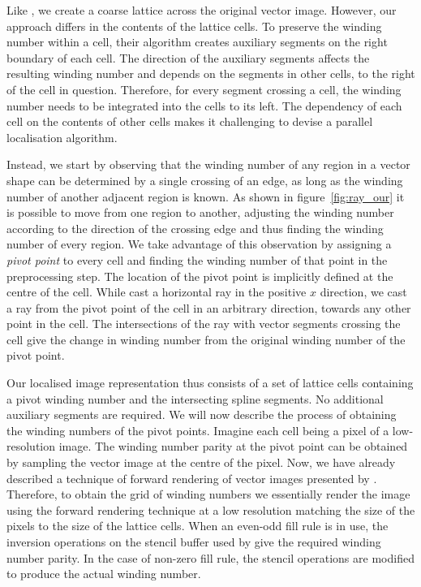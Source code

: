 \documentclass[11pt,a4paper,twoside]{article}
\begin{document}
Like \cite{NehabHoppe08}, we create a coarse lattice across the original vector image. However, our approach differs in the contents of the lattice cells. To preserve the winding number within a cell, their algorithm creates auxiliary segments on the right boundary of each cell. The direction of the auxiliary segments affects the resulting winding number and depends on the segments in other cells, to the right of the cell in question. Therefore, for every segment crossing a cell, the winding number needs to be integrated into the cells to its left. The dependency of each cell on the contents of other cells makes it challenging to devise a parallel localisation algorithm.

Instead, we start by observing that the winding number of any region in a vector shape can be determined by a single crossing of an edge, as long as the winding number of another adjacent region is known. As shown in figure~\ref{fig:ray_our} it is possible to move from one region to another, adjusting the winding number according to the direction of the crossing edge and thus finding the winding number of every region. We take advantage of this observation by assigning a \emph{pivot point} to every cell and finding the winding number of that point in the preprocessing step. The location of the pivot point is implicitly defined at the centre of the cell. While \cite{NehabHoppe08} cast a horizontal ray in the positive $x$ direction, we cast a ray from the pivot point of the cell in an arbitrary direction, towards any other point in the cell. The intersections of the ray with vector segments crossing the cell give the change in winding number from the original winding number of the pivot point.

Our localised image representation thus consists of a set of lattice cells containing a pivot winding number and the intersecting spline segments. No additional auxiliary segments are required. We will now describe the process of obtaining the winding numbers of the pivot points. Imagine each cell being a pixel of a low-resolution image. The winding number parity at the pivot point can be obtained by sampling the vector image at the centre of the pixel. Now, we have already described a technique of forward rendering of vector images presented by \cite{Kokojima06}. Therefore, to obtain the grid of winding numbers we essentially render the image using the forward rendering technique at a low resolution matching the size of the pixels to the size of the lattice cells. When an even-odd fill rule is in use, the inversion operations on the stencil buffer used by \cite{Kokojima06} give the required winding number parity. In the case of non-zero fill rule, the stencil operations are modified to produce the actual winding number.
\end{document}
